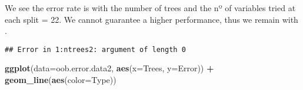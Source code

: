 \documentclass[
]{article}
\newenvironment{Shaded}{\begin{snugshade}}{\end{snugshade}}
\newcommand{\DataTypeTok}[1]{\textcolor[rgb]{0.13,0.29,0.53}{#1}}
\newcommand{\DecValTok}[1]{\textcolor[rgb]{0.00,0.00,0.81}{#1}}
\newcommand{\KeywordTok}[1]{\textcolor[rgb]{0.13,0.29,0.53}{\textbf{#1}}}
\newcommand{\NormalTok}[1]{#1}
\newcommand{\OperatorTok}[1]{\textcolor[rgb]{0.81,0.36,0.00}{\textbf{#1}}}
\newcommand{\StringTok}[1]{\textcolor[rgb]{0.31,0.60,0.02}{#1}}
\begin{document}
\begin{Shaded}
\end{Shaded}

We see the error rate is with the number of trees and the nº of
variables tried at each split = 22. We cannot guarantee a higher
performance, thus we remain with .

\begin{Shaded}
\end{Shaded}

\begin{verbatim}
## Error in 1:ntrees2: argument of length 0
\end{verbatim}

\begin{Shaded}
\begin{Highlighting}[]
\KeywordTok{ggplot}\NormalTok{(}\DataTypeTok{data=}\NormalTok{oob.error.data2, }\KeywordTok{aes}\NormalTok{(}\DataTypeTok{x=}\NormalTok{Trees, }\DataTypeTok{y=}\NormalTok{Error)) }\OperatorTok{+}
\StringTok{  }\KeywordTok{geom_line}\NormalTok{(}\KeywordTok{aes}\NormalTok{(}\DataTypeTok{color=}\NormalTok{Type))}
\end{Highlighting}
\end{Shaded}
\end{document}
